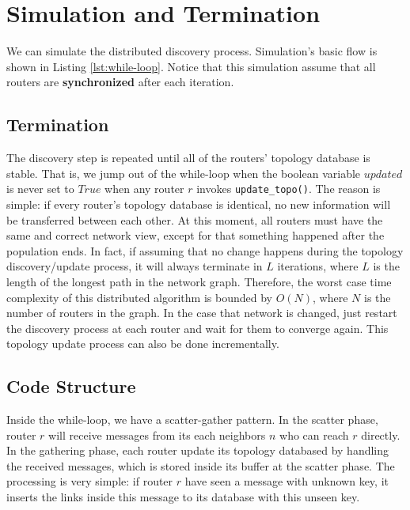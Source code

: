 \documentclass[12pt]{article}  %
\theoremstyle{definition}
\theoremstyle{remark}
\begin{document}
\section{Simulation and Termination}
We can simulate the distributed discovery process.
Simulation's basic flow is shown in Listing \ref{lst:while-loop}.
Notice that this simulation assume that all routers are \textbf{synchronized} after each iteration.

\subsection{Termination}
The discovery step is repeated until all of the routers' topology database is stable.
That is, we jump out of the while-loop when the boolean variable $updated$ is never set to $True$ when any router $r$ invokes \texttt{update\_topo()}.
The reason is simple: if every router's topology database is identical, no new information will be transferred between each other.
At this moment, all routers must have the same and correct network view, except for that something happened after the population ends.
In fact, if assuming that no change happens during the topology discovery/update process, it will always terminate in $L$ iterations, where $L$ is the length of the longest path in the network graph.
Therefore, the worst case time complexity of this distributed algorithm is bounded by $O(N)$, where $N$ is the number of routers in the graph.
In the case that network is changed, just restart the discovery process at each router and wait for them to converge again.
This topology update process can also be done incrementally.

\subsection{Code Structure}
Inside the while-loop, we have a scatter-gather pattern.
In the scatter phase, router $r$ will receive messages from its each neighbors $n$ who can reach $r$ directly.
In the gathering phase, each router update its topology databased by handling the received messages, which is stored inside its buffer at the scatter phase.
The processing is very simple: if router $r$ have seen a message with unknown key, it inserts the links inside this message to its database with this unseen key.
\end{document}
